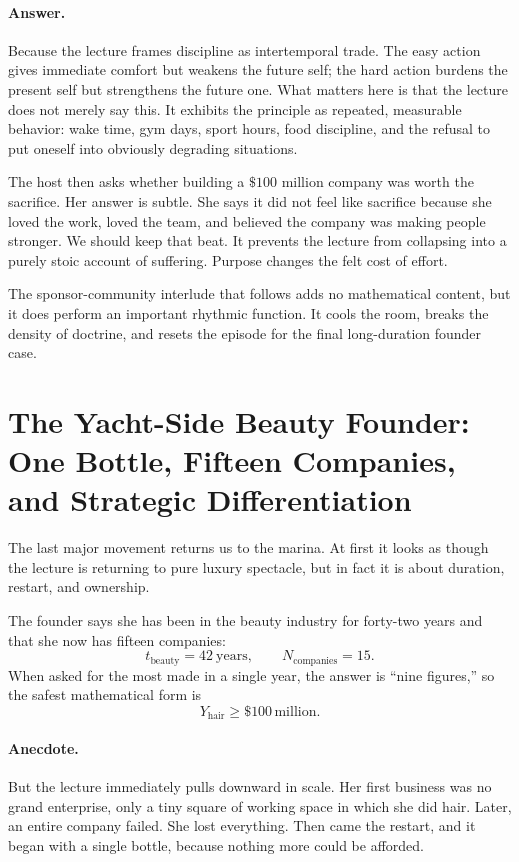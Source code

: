 \paragraph{Answer.}
Because the lecture frames discipline as intertemporal trade. The easy action gives immediate comfort but weakens the future self; the hard action burdens the present self but strengthens the future one. What matters here is that the lecture does not merely say this. It exhibits the principle as repeated, measurable behavior: wake time, gym days, sport hours, food discipline, and the refusal to put oneself into obviously degrading situations.

The host then asks whether building a \(\$100\) million company was worth the sacrifice. Her answer is subtle. She says it did not feel like sacrifice because she loved the work, loved the team, and believed the company was making people stronger. We should keep that beat. It prevents the lecture from collapsing into a purely stoic account of suffering. Purpose changes the felt cost of effort.

The sponsor-community interlude that follows adds no mathematical content, but it does perform an important rhythmic function. It cools the room, breaks the density of doctrine, and resets the episode for the final long-duration founder case.

\section{The Yacht-Side Beauty Founder: One Bottle, Fifteen Companies, and Strategic Differentiation}

The last major movement returns us to the marina. At first it looks as though the lecture is returning to pure luxury spectacle, but in fact it is about duration, restart, and ownership.

The founder says she has been in the beauty industry for forty-two years and that she now has fifteen companies:
\begin{equation}
t_{\text{beauty}} = 42\ \text{years},
\qquad
N_{\text{companies}} = 15.
\end{equation}
When asked for the most made in a single year, the answer is ``nine figures,'' so the safest mathematical form is
\begin{equation}
Y_{\text{hair}} \ge \$100\,\text{million}.
\end{equation}

\paragraph{Anecdote.}
But the lecture immediately pulls downward in scale. Her first business was no grand enterprise, only a tiny square of working space in which she did hair. Later, an entire company failed. She lost everything. Then came the restart, and it began with a single bottle, because nothing more could be afforded.

